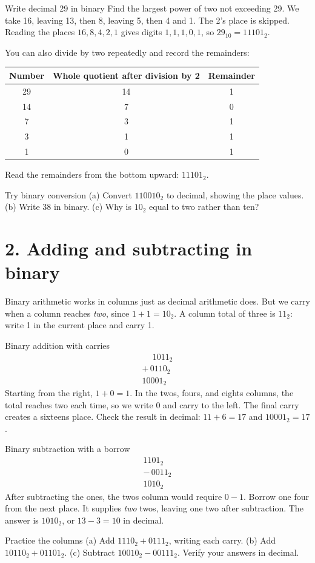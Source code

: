 \documentclass[10pt]{article}
\newcommand{\sect}[1]{\medskip\section*{\color{olive}#1}\vspace{-5pt}}
\begin{document}
\begin{worked}{Write decimal 29 in binary}
Find the largest power of two not exceeding 29. We take 16, leaving 13, then 8, leaving 5, then 4 and 1. The 2's place is skipped. Reading the places $16,8,4,2,1$ gives digits $1,1,1,0,1$, so $29_{10}=11101_2$.

You can also divide by two repeatedly and record the remainders:
\begin{center}\begin{tabular}{ccc}\toprule
Number & Whole quotient after division by 2 & Remainder\\\midrule
29 & 14 & 1\\14 & 7 & 0\\7 & 3 & 1\\3 & 1 & 1\\1 & 0 & 1\\\bottomrule
\end{tabular}\end{center}
Read the remainders from the bottom upward: $11101_2$.
\end{worked}
\begin{taskbox}{Try binary conversion}
(a) Convert $110010_2$ to decimal, showing the place values. (b) Write 38 in binary. (c) Why is $10_2$ equal to two rather than ten?
\end{taskbox}

\sect{2. Adding and subtracting in binary}
Binary arithmetic works in columns just as decimal arithmetic does. But we carry when a column reaches \emph{two}, since $1+1=10_2$. A column total of three is $11_2$: write 1 in the current place and carry 1.

\begin{worked}{Binary addition with carries}
\[
\begin{array}{r}
\phantom{+}1011_2\\[-2pt]
+\,0110_2\\ \hline
10001_2
\end{array}
\]
Starting from the right, $1+0=1$. In the twos, fours, and eights columns, the total reaches two each time, so we write 0 and carry to the left. The final carry creates a sixteens place. Check the result in decimal: $11+6=17$ and $10001_2=17$.
\end{worked}
\begin{worked}{Binary subtraction with a borrow}
\[
\begin{array}{r}
1101_2\\[-2pt]
-\,0011_2\\ \hline
1010_2
\end{array}
\]
After subtracting the ones, the twos column would require $0-1$. Borrow one four from the next place. It supplies \emph{two} twos, leaving one two after subtraction. The answer is $1010_2$, or $13-3=10$ in decimal.
\end{worked}
\begin{taskbox}{Practice the columns}
(a) Add $1110_2+0111_2$, writing each carry. (b) Add $10110_2+01101_2$. (c) Subtract $10010_2-00111_2$. Verify your answers in decimal.
\end{taskbox}
\end{document}

